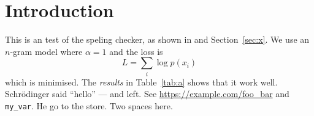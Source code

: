 \documentclass{article}
\begin{document}
\section{Introduction}
This is an test of the speling checker, as shown in \cite{knuth84} and Section~\ref{sec:x}.
We use an $n$-gram model where $\alpha = 1$ and the loss is
\begin{equation}
  L = \sum_i \log p(x_i) \label{eq:loss}
\end{equation}
which is minimised. The \emph{results} in Table~\ref{tab:a} shows that it work well.
Schr\"odinger said ``hello'' --- and left. See \url{https://example.com/foo_bar} and \texttt{my_var}.
He go to the store.  Two spaces here.
\end{document}
